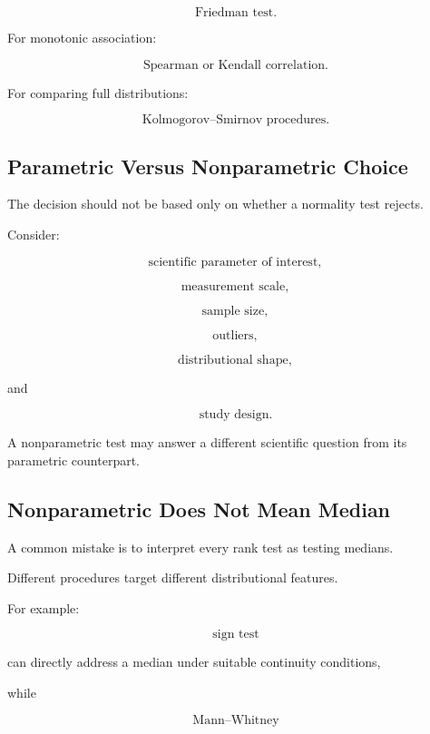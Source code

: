 \[
\boxed{
\text{Friedman test}.
}
\]

For monotonic association:

\[
\boxed{
\text{Spearman or Kendall correlation}.
}
\]

For comparing full distributions:

\[
\boxed{
\text{Kolmogorov--Smirnov procedures}.
}
\]

\subsection{Parametric Versus Nonparametric Choice}
\label{subsec:parametric-versus-nonparametric-choice}

The decision should not be based only on whether a normality test rejects.

Consider:

\[
\boxed{
\text{scientific parameter of interest},
}
\]

\[
\boxed{
\text{measurement scale},
}
\]

\[
\boxed{
\text{sample size},
}
\]

\[
\boxed{
\text{outliers},
}
\]

\[
\boxed{
\text{distributional shape},
}
\]

and

\[
\boxed{
\text{study design}.
}
\]

A nonparametric test may answer a different scientific question from its
parametric counterpart.

\subsection{Nonparametric Does Not Mean Median}
\label{subsec:nonparametric-not-median}

A common mistake is to interpret every rank test as testing medians.

Different procedures target different distributional features.

For example:

\[
\boxed{
\text{sign test}
}
\]

can directly address a median under suitable continuity conditions,

while

\[
\boxed{
\text{Mann--Whitney}
}
\]

